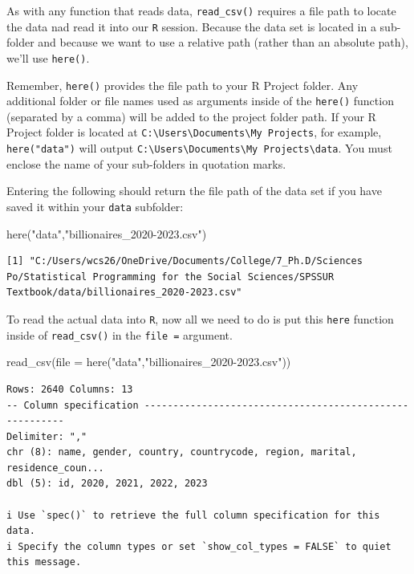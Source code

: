 \documentclass[
  letterpaper,
]{book}
\newenvironment{Shaded}{\begin{snugshade}}{\end{snugshade}}
\newcommand{\AttributeTok}[1]{\textcolor[rgb]{0.40,0.45,0.13}{#1}}
\newcommand{\FunctionTok}[1]{\textcolor[rgb]{0.28,0.35,0.67}{#1}}
\newcommand{\NormalTok}[1]{\textcolor[rgb]{0.00,0.23,0.31}{#1}}
\newcommand{\StringTok}[1]{\textcolor[rgb]{0.13,0.47,0.30}{#1}}
\begin{document}
As with any function that reads data, \texttt{read\_csv()} requires a
file path to locate the data nad read it into our \texttt{R} session.
Because the data set is located in a sub-folder and because we want to
use a relative path (rather than an absolute path), we'll use
\texttt{here()}.

Remember, \texttt{here()} provides the file path to your R Project
folder. Any additional folder or file names used as arguments inside of
the \texttt{here()} function (separated by a comma) will be added to the
project folder path. If your R Project folder is located at
\texttt{C:\textbackslash{}Users\textbackslash{}Documents\textbackslash{}My\ Projects},
for example, \texttt{here("data")} will output
\texttt{C:\textbackslash{}Users\textbackslash{}Documents\textbackslash{}My\ Projects\textbackslash{}data}.
You must enclose the name of your sub-folders in quotation marks.

Entering the following should return the file path of the data set if
you have saved it within your \texttt{data} subfolder:

\begin{Shaded}
\begin{Highlighting}[]
\FunctionTok{here}\NormalTok{(}\StringTok{"data"}\NormalTok{,}\StringTok{"billionaires\_2020{-}2023.csv"}\NormalTok{)}
\end{Highlighting}
\end{Shaded}

\begin{verbatim}
[1] "C:/Users/wcs26/OneDrive/Documents/College/7_Ph.D/Sciences Po/Statistical Programming for the Social Sciences/SPSSUR Textbook/data/billionaires_2020-2023.csv"
\end{verbatim}

To read the actual data into \texttt{R}, now all we need to do is put
this \texttt{here} function inside of \texttt{read\_csv()} in the
\texttt{file\ =} argument.

\begin{Shaded}
\begin{Highlighting}[]
\FunctionTok{read\_csv}\NormalTok{(}\AttributeTok{file =} \FunctionTok{here}\NormalTok{(}\StringTok{"data"}\NormalTok{,}\StringTok{"billionaires\_2020{-}2023.csv"}\NormalTok{))}
\end{Highlighting}
\end{Shaded}

\begin{verbatim}
Rows: 2640 Columns: 13
-- Column specification --------------------------------------------------------
Delimiter: ","
chr (8): name, gender, country, countrycode, region, marital, residence_coun...
dbl (5): id, 2020, 2021, 2022, 2023

i Use `spec()` to retrieve the full column specification for this data.
i Specify the column types or set `show_col_types = FALSE` to quiet this message.
\end{verbatim}
\end{document}

